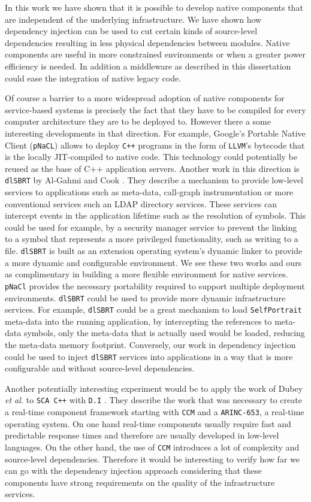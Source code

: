 In this work we have shown that it is possible to develop native components that are independent of the
underlying infrastructure. We have shown how dependency injection can be used to cut certain kinds
of source-level dependencies resulting in less physical dependencies between modules. Native components
are useful in more constrained environments or when a greater power efficiency is needed. In addition
a middleware as described in this dissertation could ease the integration of native legacy code.

Of course a barrier to a more widespread adoption of native components for service-based systems is precisely
the fact that they have to be compiled for every computer architecture they are to be deployed to. However
there a some interesting developments in that direction. For example, Google's Portable Native Client (\texttt{pNaCL}) \cite{pNaCl}
allows to deploy \texttt{C++} programs in the form of \texttt{LLVM}'s bytecode that is the locally JIT-compiled to native code.
This technology could potentially be reused as the base of C++ application servers. Another work in this
direction is \texttt{dlSBRT} by Al-Gahmi and Cook \cite{Al-Gahmi}. They describe a mechanism to provide low-level services
to applications such as meta-data, call-graph instrumentation or more conventional services such an LDAP
directory services. These services can intercept events in the application lifetime such as the resolution of
symbols. This could be used for example, by a security manager service to prevent the linking to a symbol
that represents a more privileged functionality, such as writing to a file. \texttt{dlSBRT} is built as an extension
operating system's dynamic linker to provide a more dynamic and configurable environment.
We see these two works and ours as complimentary in building a more flexible environment for native services.
\texttt{pNaCl} provides the necessary portability required to support multiple deployment environments. \texttt{dlSBRT} could
be used to provide more dynamic infrastructure services. For example, \texttt{dlSBRT} could be a great mechanism to load
\texttt{SelfPortrait} meta-data into the running application, by intercepting the references to meta-data symbols, only
the meta-data that is actually used would be loaded, reducing the meta-data memory footprint. Conversely, our
work in dependency injection could be used to inject \texttt{dlSBRT} services into applications in a way that is more
configurable and without source-level dependencies.

Another potentially interesting experiment would be to apply the work of Dubey \emph{et al.} to \texttt{SCA C++} with \texttt{D.I} \cite{Dubey}.
They describe the work that was necessary to create a real-time component framework starting with \texttt{CCM} and a \texttt{ARINC-653},
a real-time operating system. On one hand real-time components usually require fast and predictable response times and therefore
are usually developed in low-level languages. On the other hand, the use of \texttt{CCM} introduces a lot of complexity and source-level
dependencies. Therefore it would be interesting to verify how far we can go with the dependency injection approach considering
that these components have strong requirements on the quality of the infrastructure services.

